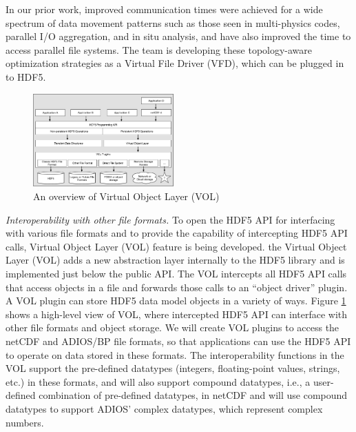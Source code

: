 In our prior work, improved communication times were achieved for a wide spectrum of data movement patterns such as those seen in multi-physics codes, parallel I/O aggregation, and in situ analysis, and have also improved the time to access parallel file systems. The team is developing these topology-aware optimization strategies as a Virtual File Driver (VFD), which can be plugged in to HDF5. 

\begin{figure}
  \begin{center}
    \includegraphics[width=0.48\textwidth]{projects/2.3.4-DataViz/2.3.4.08-ExaHDF5/VOL-Overview.pdf}
  \end{center}
  \caption{An overview of Virtual Object Layer (VOL)}
  \label{fig:vol-overview}
\end{figure}

\textit{Interoperability with other file formats.} To open the HDF5 API for interfacing with various file formats and to provide the capability of intercepting HDF5 API calls,  Virtual Object Layer (VOL) feature is being developed. the Virtual Object Layer (VOL) adds a new abstraction layer internally to the HDF5 library and is implemented just below the public API. The VOL intercepts all HDF5 API calls that access objects in a file and forwards those calls to an “object driver” plugin. A VOL plugin can store HDF5 data model objects in a variety of ways. Figure \ref{fig:vol-overview} shows a high-level view of VOL, where intercepted HDF5 API can interface with other file formats and object storage. We will create VOL plugins to access the netCDF and ADIOS/BP file formats, so that applications can use the HDF5 API to operate on data stored in these formats. The interoperability functions in the VOL support the pre-defined datatypes (integers, floating-point values, strings, etc.) in these formats, and will also support compound datatypes, i.e., a user-defined combination of pre-defined datatypes, in netCDF and will use compound datatypes to support ADIOS’ complex datatypes, which represent complex numbers.


